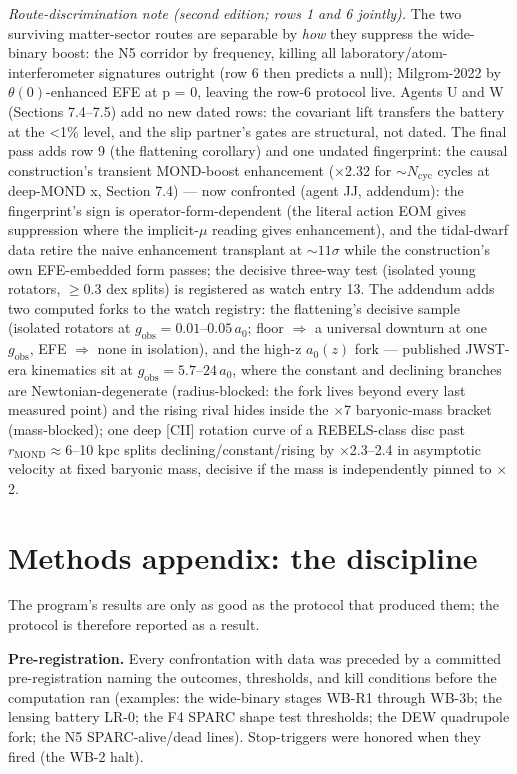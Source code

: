 \documentclass[11pt,a4paper]{article}
\begin{document}
\emph{Route-discrimination note (second edition; rows 1 and 6 jointly).} The two surviving matter-sector routes are separable by \emph{how} they suppress the wide-binary boost: the N5 corridor by frequency, killing all laboratory/atom-interferometer signatures outright (row 6 then predicts a null); Milgrom-2022 by $\theta(0)$-enhanced EFE at p = 0, leaving the row-6 protocol live. Agents U and W (Sections 7.4--7.5) add no new dated rows: the covariant lift transfers the battery at the <1\% level, and the slip partner's gates are structural, not dated. The final pass adds row 9 (the flattening corollary) and one undated fingerprint: the causal construction's transient MOND-boost enhancement ($\times$2.32 for $\sim{}N_{\mathrm{cyc}}$ cycles at deep-MOND x, Section 7.4) --- now confronted (agent JJ, addendum): the fingerprint's sign is operator-form-dependent (the literal action EOM gives suppression where the implicit-$\mu$ reading gives enhancement), and the tidal-dwarf data retire the naive enhancement transplant at ${\sim}11\sigma$ while the construction's own EFE-embedded form passes; the decisive three-way test (isolated young rotators, $\ge$0.3 dex splits) is registered as watch entry 13. The addendum adds two computed forks to the watch registry: the flattening's decisive sample (isolated rotators at $g_{\mathrm{obs}} = 0.01$--$0.05\,a_0$; floor $\Rightarrow$ a universal downturn at one $g_{\mathrm{obs}}$, EFE $\Rightarrow$ none in isolation), and the high-z $a_0(z)$ fork --- published JWST-era kinematics sit at $g_{\mathrm{obs}} = 5.7$--$24\,a_0$, where the constant and declining branches are Newtonian-degenerate (radius-blocked: the fork lives beyond every last measured point) and the rising rival hides inside the $\times$7 baryonic-mass bracket (mass-blocked); one deep [CII] rotation curve of a REBELS-class disc past $r_{\mathrm{MOND}} \approx 6$--10 kpc splits declining/constant/rising by $\times$2.3--2.4 in asymptotic velocity at fixed baryonic mass, decisive if the mass is independently pinned to $\times$2.

\section{Methods appendix: the discipline}

The program's results are only as good as the protocol that produced them; the protocol is therefore reported as a result.

\textbf{Pre-registration.} Every confrontation with data was preceded by a committed pre-registration naming the outcomes, thresholds, and kill conditions before the computation ran (examples: the wide-binary stages WB-R1 through WB-3b; the lensing battery LR-0; the F4 SPARC shape test thresholds; the DEW quadrupole fork; the N5 SPARC-alive/dead lines). Stop-triggers were honored when they fired (the WB-2 halt).
\end{document}
